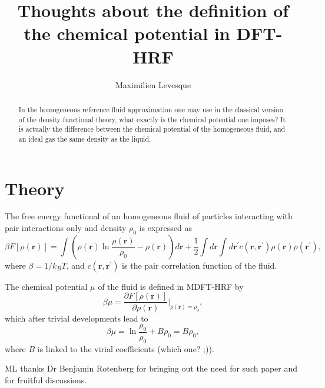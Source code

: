 \documentclass[aps,pre,preprint,showpacs,amsmath,amssymb,superscriptaddress]{revtex4-1}
\newcommand{\rr}{\mathbf{r}}
\newcommand{\rrp}{\mathbf{r}^\prime}
\newcommand{\rhor}{\rho\left(\mathbf{\rr}\right)}
\newcommand{\rhorp}{\rho\left(\mathbf{\rrp}\right)}
\begin{document}
\title{Thoughts about the definition of the chemical potential in DFT-HRF}


\author{Maximilien Levesque}


\begin{abstract}
In the homogeneous reference fluid approximation one may use in the classical version of the density functional theory,
what exactly is the chemical potential one imposes?
It is actually the difference between the chemical potential of the homogeneous fluid, and an ideal gas the
same density as the liquid.
\end{abstract}

\maketitle

\section{Theory}

The free energy functional of an homogeneous fluid of particles interacting with pair interactions only and density $\rho_0$ is expressed as
\begin{equation}
    \beta F[\rhor] = \int \left( \rhor \ln \frac{\rhor}{\rho_0} - \rhor \right) d\rr +\frac{1}{2}\int d\rr \int d\rrp c(\rr,\rrp) \rhor \rhorp,
\end{equation}
where $\beta=1/k_B T$, and $c(\rr,\rrp)$ is the pair correlation function of the fluid.

The chemical potential $\mu$ of the fluid is defined in MDFT-HRF by
\begin{equation}
    \beta\mu = \frac{\partial F[\rhor]}{\partial \rhor}\Big|_{\rhor=\rho_0},
\end{equation}
which after trivial developments lead to
\begin{equation}
    \beta\mu = \ln\frac{\rho_0}{\rho_0} + B\rho_0 = B\rho_0,
\end{equation}
where $B$ is linked to the virial coefficients (which one? ;)).


\begin{acknowledgments}
ML thanks Dr Benjamin Rotenberg for bringing out the need for such paper and for fruitful discussions.
\end{acknowledgments}



\end{document}
